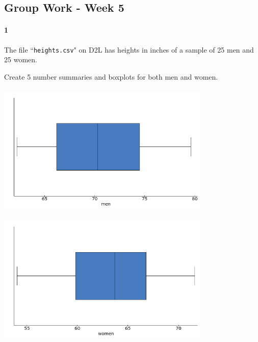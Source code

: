 \documentclass{article}
\begin{document}
\begin{flushleft}
\section*{Group Work - Week 5}

\paragraph{1} The file ``\verb+heights.csv+" on D2L has heights in inches of a sample of 25 men and 25 women.\\ \medskip


\begin{enumalpha}
\item Create 5 number summaries and boxplots for both men and women.\\
\medskip
{}\\
\includegraphics[width=4in]{images/group05_Q1_a_men}\\
\medskip
{}\\
\includegraphics[width=4in]{images/group05_Q1_a_women}\\


\end{enumalpha}
\end{flushleft}
\end{document}
